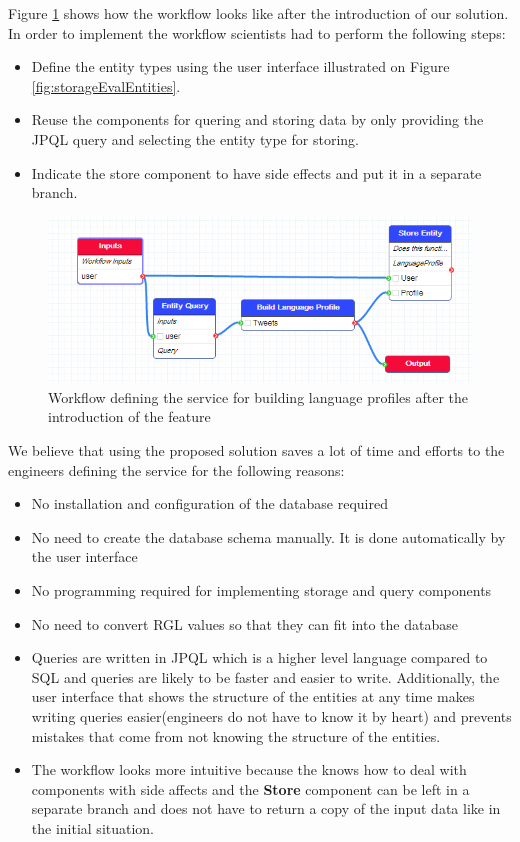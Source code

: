 Figure \ref{fig:storageEvalAfter} shows how the workflow looks like after the introduction of our solution. In order to implement the workflow scientists had to perform the following steps:
\begin{itemize}
	\item Define the entity types using the user interface illustrated on Figure \ref{fig:storageEvalEntities}.
	\item Reuse the components for quering and storing data by only providing the JPQL query and selecting the entity type for storing.
	\item Indicate the store component to have side effects and put it in a separate branch.
\end{itemize}

\begin{figure}[h!]
  \centering
  	\includegraphics[scale=0.5]{storage/eval/after.png}
  \caption{Workflow defining the service for building language profiles after the introduction of the feature}
  \label{fig:storageEvalAfter}
\end{figure}

We believe that using the proposed solution saves a lot of time and efforts to the engineers defining the service for the following reasons:

\begin{itemize}
	\item No installation and configuration of the database required
	\item No need to create the database schema manually. It is done automatically by the user interface
	\item No programming required for implementing storage and query components
	\item No need to convert RGL values so that they can fit into the database
	\item Queries are written in JPQL which is a higher level language compared to SQL and queries are likely to be faster and easier to write. Additionally, the user interface that shows the structure of the entities at any time makes writing queries easier(engineers do not have to know it by heart) and prevents mistakes that come from not knowing the structure of the entities. 
	\item The workflow looks more intuitive because the knows how to deal with components with side affects and the \textbf{Store} component can be left in a separate branch and does not have to return a copy of the input data like in the initial situation.
\end{itemize}


